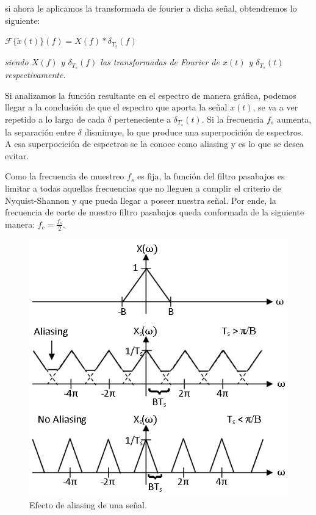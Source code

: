 \documentclass[../../ASSD_TP1_G7.tex]{subfiles}
\begin{document}
si ahora le aplicamos la transformada de fourier a dicha señal, obtendremos
lo siguiente:
\begin{center}
{\Large{}$\mathcal{F}\{\tilde{x}(t)\}(f)=X(f)*\delta_{T_{s}}(f)$}{\Large\par}
\par\end{center}

\begin{center}
\textit{\footnotesize{}siendo $X(f)$ y $\delta_{T_{s}}(f)$ las transformadas
de Fourier de $x(t)$ y $\delta_{T_{s}}(t)$ respectivamente. }{\footnotesize\par}
\par\end{center}

Si analizamos la función resultante en el espectro de manera gráfica,
podemos llegar a la conclusión de que el espectro que aporta la señal
$x(t)$, se va a ver repetido a lo largo de cada $\delta$ perteneciente
a $\delta_{T_{s}}(t)$. Si la frecuencia $f_{s}$ aumenta, la separación
entre $\delta$ disminuye, lo que produce una superpocición de espectros.
A esa superpocición de espectros se la conoce como aliasing y es lo
que se desea evitar.

Como la frecuencia de muestreo $f_{s}$ es fija, la función del filtro
pasabajos es limitar a todas aquellas frecuencias que no lleguen a
cumplir el criterio de Nyquist-Shannon y que pueda llegar a poseer
nuestra señal. Por ende, la frecuencia de corte de nuestro filtro
pasabajos queda conformada de la siguiente manera: $f_{c}=\frac{f_{s}}{2}$.


\begin{figure}%
\begin{centering}
\includegraphics[scale=0.6]{Imagenes/aliasing}\caption{Efecto de aliasing de una señal.}
\par\end{centering}
\end{figure}%
\end{document}

